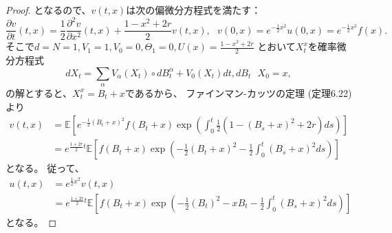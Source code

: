\documentclass[uplatex]{jsarticle}
\theoremstyle{definition}
\def\E{\mathbb{E}}
\begin{document}
\begin{proof}
  となるので、\(v(t,x)\)は次の偏微分方程式を満たす：
  \[
  \frac{\partial v}{\partial t}(t,x)
  = \frac{1}{2}\frac{\partial^2 v}{\partial x^2}(t,x)
  + \frac{1 - x^2 + 2r}{2}v(t,x), \ \ \
  v(0,x) = e^{-\frac{1}{2}x^2}u(0,x) = e^{-\frac{1}{2}x^2}f(x).
  \]
  そこで\(d=N=1,V_1=1,V_0=0,\Theta_1=0,U(x)=\frac{1 - x^2 + 2r}{2}\)
  とおいて\(X_t^x\)を確率微分方程式
  \[
  dX_t = \sum_{\alpha}V_\alpha(X_t) \circ dB_t^\alpha + V_0(X_t)dt,
  dB_t
  \ \ \ X_0 = x,
  \]
  の解とすると、\(X_t^x = B_t + x\)であるから、
  ファインマン-カッツの定理 (定理6.22) より
  \begin{align*}
    v(t,x)
    &= \E \left[ e^{-\frac{1}{2}(B_t + x)^2}f(B_t+x)
    \exp\left( \int_0^t \frac{1}{2}\left( 1-(B_s+x)^2 + 2r
    \right) ds\right) \right] \\
    &= e^{\frac{1+2r}{2}t}\E \left[ f(B_t+x) \exp\left(
    -\frac{1}{2}(B_t + x)^2 - \frac{1}{2}\int_0^t (B_s+x)^2 ds \right) \right]
  \end{align*}
  となる。
  従って、
  \begin{align*}
    u(t,x) &= e^{\frac{1}{2}x^2}v(t,x) \\
    &= e^{\frac{1+2r}{2}t} \E \left[ f(B_t+x) \exp\left(
    - \frac{1}{2}(B_t)^2 - xB_t - \frac{1}{2}\int_0^t (B_s+x)^2 ds
    \right) \right]
  \end{align*}
  となる。
\end{proof}
\end{document}
